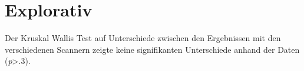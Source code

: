 \section{Explorativ}
Der Kruskal Wallis Test auf Unterschiede zwischen den  Ergebnissen mit den verschiedenen Scannern zeigte keine signifikanten Unterschiede anhand der Daten (\textit{p}>.3).





